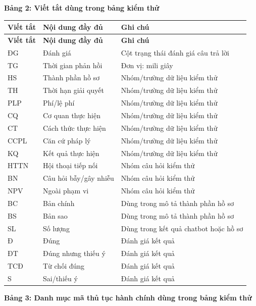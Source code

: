 \vspace{0.5em}
\noindent\textbf{Bảng 2: Viết tắt dùng trong bảng kiểm thử}

\renewcommand{\arraystretch}{1.25}
\begin{longtable}{|>{\centering\arraybackslash}p{2.4cm}|p{5.2cm}|p{7.1cm}|}
\hline
\textbf{Viết tắt} & \textbf{Nội dung đầy đủ} & \textbf{Ghi chú} \\ \hline
\endfirsthead
\hline
\textbf{Viết tắt} & \textbf{Nội dung đầy đủ} & \textbf{Ghi chú} \\ \hline
\endhead
ĐG & Đánh giá & Cột trạng thái đánh giá câu trả lời \\ \hline
TG & Thời gian phản hồi & Đơn vị: mili giây \\ \hline
HS & Thành phần hồ sơ & Nhóm/trường dữ liệu kiểm thử \\ \hline
TH & Thời hạn giải quyết & Nhóm/trường dữ liệu kiểm thử \\ \hline
PLP & Phí/lệ phí & Nhóm/trường dữ liệu kiểm thử \\ \hline
CQ & Cơ quan thực hiện & Nhóm/trường dữ liệu kiểm thử \\ \hline
CT & Cách thức thực hiện & Nhóm/trường dữ liệu kiểm thử \\ \hline
CCPL & Căn cứ pháp lý & Nhóm/trường dữ liệu kiểm thử \\ \hline
KQ & Kết quả thực hiện & Nhóm/trường dữ liệu kiểm thử \\ \hline
HTTN & Hội thoại tiếp nối & Nhóm câu hỏi kiểm thử \\ \hline
BN & Câu hỏi bẫy/gây nhiễu & Nhóm câu hỏi kiểm thử \\ \hline
NPV & Ngoài phạm vi & Nhóm câu hỏi kiểm thử \\ \hline
BC & Bản chính & Dùng trong mô tả thành phần hồ sơ \\ \hline
BS & Bản sao & Dùng trong mô tả thành phần hồ sơ \\ \hline
SL & Số lượng & Dùng trong kết quả chatbot hoặc hồ sơ \\ \hline
Đ & Đúng & Đánh giá kết quả \\ \hline
ĐT & Đúng nhưng thiếu ý & Đánh giá kết quả \\ \hline
TCĐ & Từ chối đúng & Đánh giá kết quả \\ \hline
S & Sai/thiếu ý & Đánh giá kết quả \\ \hline
\end{longtable}

\vspace{0.5em}
\noindent\textbf{Bảng 3: Danh mục mã thủ tục hành chính dùng trong bảng kiểm thử}

